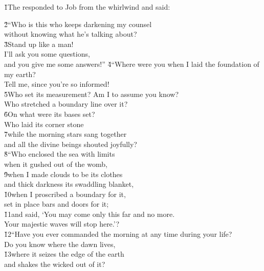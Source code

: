 \v{1}The  responded to Job from the whirlwind and said:

\begin{poetry}
\poeml \v{2}``Who is this who keeps darkening my counsel \\
\poemll    without knowing what he's talking about? \\
\poeml \v{3}Stand up like a man! \\
\poemll    I'll ask you some questions, \\
\poemlll       and you give me some answers!''
\poeml \v{4}``Where were you when I laid the foundation of my earth? \\
\poemll    Tell me, since you're so informed! \\
\poeml \v{5}Who set its measurement? Am I to assume you know? \\
\poemll    Who stretched a boundary line over it? \\
\poeml \v{6}On what were its bases set? \\
\poemll    Who laid its corner stone \\
\poeml \v{7}while the morning stars sang together \\
\poemll    and all the divine beings shouted joyfully? \\
\poeml \v{8}``Who enclosed the sea with limits \\
\poemll    when it gushed out of the womb, \\
\poeml \v{9}when I made clouds to be its clothes \\
\poemll    and thick darkness its swaddling blanket, \\
\poeml \v{10}when I proscribed a boundary for it, \\
\poemll    set in place bars and doors for it; \\
\poeml \v{11}and said, `You may come only this far and no more. \\
\poemll    Your majestic waves will stop here.'? \\
\poeml \v{12}``Have you ever commanded the morning at any time during your life? \\
\poemll    Do you know where the dawn lives, \\
\poeml \v{13}where it seizes the edge of the earth \\
\poemll    and shakes the wicked out of it? \\

\end{poetry}
